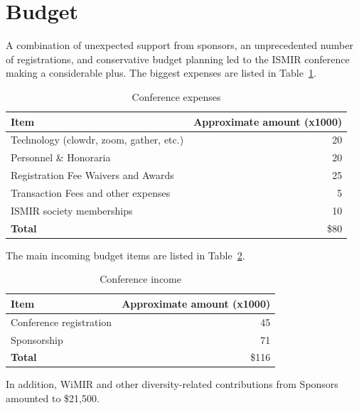 \documentclass[%
10pt,								%
]
{scrartcl}
\begin{document}
\section{Budget}
    A combination of unexpected support from sponsors, an unprecedented number of registrations, and conservative budget planning led to the ISMIR conference making a considerable plus. The biggest expenses are listed in Table~\ref{tab:expenses}.
                \begin{table}
                    \begin{tabular}{l|r}
                        \textbf{Item} & \textbf{Approximate amount (x1000)}\\ \hline
                        
                        Technology (clowdr, zoom, gather, etc.) & 20 \\
                        Personnel \& Honoraria & 20 \\
                        Registration Fee Waivers and Awards & 25 \\
                        Transaction Fees and other expenses & 5 \\
                        ISMIR society memberships & 10 \\
                        \hline
                        \textbf{Total} & \$80
                    
                    \end{tabular}
                    \caption{Conference expenses}
                    \label{tab:expenses}
                \end{table}
                The main incoming budget items are listed in Table~\ref{tab:income}.
                \begin{table}
                    \begin{tabular}{l|r}
                        \textbf{Item} & \textbf{Approximate amount (x1000)}\\ \hline
                        
                        Conference registration & 45 \\
                        Sponsorship & 71 \\
                        \hline
                        \textbf{Total} & \$116
                    
                    \end{tabular}
                    \caption{Conference income}
                    \label{tab:income}
                \end{table}
                In addition, WiMIR and other diversity-related contributions from Sponsors amounted to \$21,500.
                
\end{document}
